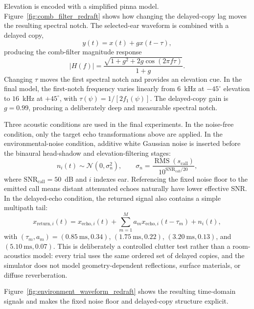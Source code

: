 Elevation is encoded with a simplified pinna model. Figure~\ref{fig:comb_filter_redraft} shows how changing the delayed-copy lag moves the resulting spectral notch. The selected-ear waveform is combined with a delayed copy,
\begin{equation}
    y(t)=x(t)+g x(t-\tau),
\end{equation}
producing the comb-filter magnitude response
\begin{equation}
    |H(f)| = \frac{\sqrt{1+g^2+2g\cos(2\pi f \tau)}}{1+g}.
\end{equation}
Changing $\tau$ moves the first spectral notch and provides an elevation cue. In the final model, the first-notch frequency varies linearly from $6$~kHz at $-45^\circ$ elevation to $16$~kHz at $+45^\circ$, with $\tau(\psi)=1/[2f_1(\psi)]$. The delayed-copy gain is $g=0.99$, producing a deliberately deep and measurable spectral notch.

Three acoustic conditions are used in the final experiments. In the noise-free condition, only the target echo transformations above are applied. In the environmental-noise condition, additive white Gaussian noise is inserted before the binaural head-shadow and elevation-filtering stages:
\begin{equation}
    n_i(t)\sim\mathcal{N}(0,\sigma_n^2),
    \qquad
    \sigma_n
    =
    \frac{\operatorname{RMS}(s_{\mathrm{call}})}
    {10^{\mathrm{SNR}_{\mathrm{call}}/20}},
\end{equation}
where $\mathrm{SNR}_{\mathrm{call}}=50$~dB and $i$ indexes ear. Referencing the fixed noise floor to the emitted call means distant attenuated echoes naturally have lower effective SNR. In the delayed-echo condition, the returned signal also contains a simple multipath tail:
\begin{equation}
    x_{\mathrm{return},i}(t)
    =
    x_{\mathrm{echo},i}(t)
    +
    \sum_{m=1}^{M} a_m x_{\mathrm{echo},i}(t-\tau_m)
    +
    n_i(t),
\end{equation}
with $(\tau_m,a_m)=(0.85~\mathrm{ms},0.34)$, $(1.75~\mathrm{ms},0.22)$, $(3.20~\mathrm{ms},0.13)$, and $(5.10~\mathrm{ms},0.07)$. This is deliberately a controlled clutter test rather than a room-acoustics model: every trial uses the same ordered set of delayed copies, and the simulator does not model geometry-dependent reflections, surface materials, or diffuse reverberation.

Figure~\ref{fig:environment_waveform_redraft} shows the resulting time-domain signals and makes the fixed noise floor and delayed-copy structure explicit.

